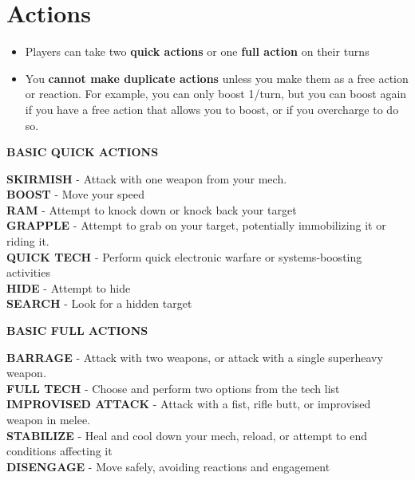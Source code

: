 \section{Actions}

\begin{itemize}
    \item Players can take two \textbf{quick actions} or one \textbf{full action} on their turns
    \item You \textbf{cannot make duplicate actions} unless you make them as a free action or reaction. For example, you can only boost 1/turn, but you can boost again if you have a free action that allows you to boost, or if you overcharge to do so.
\end{itemize}

\begin{center}
    \textbf{BASIC QUICK ACTIONS}
\end{center}
\textbf{SKIRMISH} - Attack with one weapon from your mech.\\
\textbf{BOOST} - Move your speed\\
\textbf{RAM} - Attempt to knock down or knock back your target\\
\textbf{GRAPPLE} - Attempt to grab on your target, potentially immobilizing it or riding it.\\
\textbf{QUICK TECH} - Perform quick electronic warfare or systems-boosting activities\\
\textbf{HIDE} - Attempt to hide \\
\textbf{SEARCH} - Look for a hidden target

\begin{center}
    \textbf{BASIC FULL ACTIONS}
\end{center}
\textbf{BARRAGE} - Attack with two weapons, or attack with a single superheavy weapon.\\
\textbf{FULL TECH} - Choose and perform two options from the tech list\\
\textbf{IMPROVISED ATTACK} - Attack with a fist, rifle butt, or improvised weapon in melee.\\
\textbf{STABILIZE} - Heal and cool down your mech, reload, or attempt to end conditions affecting it\\
\textbf{DISENGAGE} - Move safely, avoiding reactions and engagement


